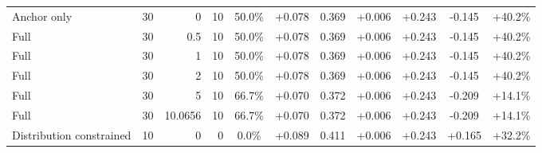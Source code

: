 \begin{table}[htbp]
\begin{tabular}{lrrrccccccc}
Anchor only & 30 & 0 & 10 & 50.0\% & +0.078 & 0.369 & +0.006 & +0.243 & -0.145 & +40.2\% \\
Full & 30 & 0.5 & 10 & 50.0\% & +0.078 & 0.369 & +0.006 & +0.243 & -0.145 & +40.2\% \\
Full & 30 & 1 & 10 & 50.0\% & +0.078 & 0.369 & +0.006 & +0.243 & -0.145 & +40.2\% \\
Full & 30 & 2 & 10 & 50.0\% & +0.078 & 0.369 & +0.006 & +0.243 & -0.145 & +40.2\% \\
Full & 30 & 5 & 10 & 66.7\% & +0.070 & 0.372 & +0.006 & +0.243 & -0.209 & +14.1\% \\
Full & 30 & 10.0656 & 10 & 66.7\% & +0.070 & 0.372 & +0.006 & +0.243 & -0.209 & +14.1\% \\
Distribution constrained & 10 & 0 & 0 & 0.0\% & +0.089 & 0.411 & +0.006 & +0.243 & +0.165 & +32.2\% \\
\bottomrule
\end{tabular}
\end{table}